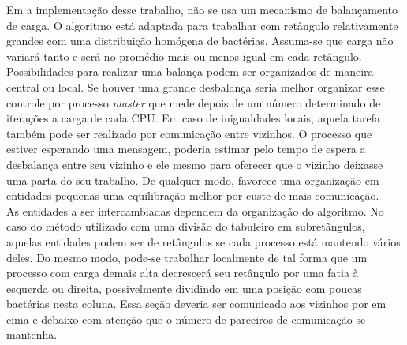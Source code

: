 Em a implementação desse trabalho, não se usa um mecanismo de balançamento de carga. O algoritmo está adaptada para trabalhar com retângulo relativamente grandes com uma distribuição homógena de bactérias. Assuma-se que carga não variará tanto e será no promédio mais ou menos igual em cada retângulo.\\

Possibilidades para realizar uma balança podem ser organizados de maneira central ou local. Se houver uma grande desbalança seria melhor organizar esse controle por processo \textit{master} que mede depois de um número determinado de iterações a carga de cada CPU. Em caso de inigualdades locais, aquela tarefa também pode ser realizado por comunicação entre vizinhos. O processo que estiver esperando uma mensagem, poderia estimar pelo tempo de espera a desbalança entre seu vizinho e ele mesmo para oferecer que o vizinho deixasse uma parta do seu trabalho. De qualquer modo, favorece uma organização em entidades pequenas uma equilibração melhor por custe de mais comunicação.\\

As entidades a ser intercambiadas dependem da organização do algoritmo. No caso do método utilizado com uma divisão do tabuleiro em subretãngulos, aquelas entidades podem ser de retângulos se cada processo está mantendo vários deles. Do mesmo modo, pode-se trabalhar localmente de tal forma que um processo com carga demais alta decrescerá seu retângulo por uma fatia à esquerda ou direita, possivelmente dividindo em uma posição com poucas bactérias nesta coluna. Essa seção deveria ser comunicado aos vizinhos por em cima e debaixo com atenção que o número de parceiros de comunicação se mantenha.\\
